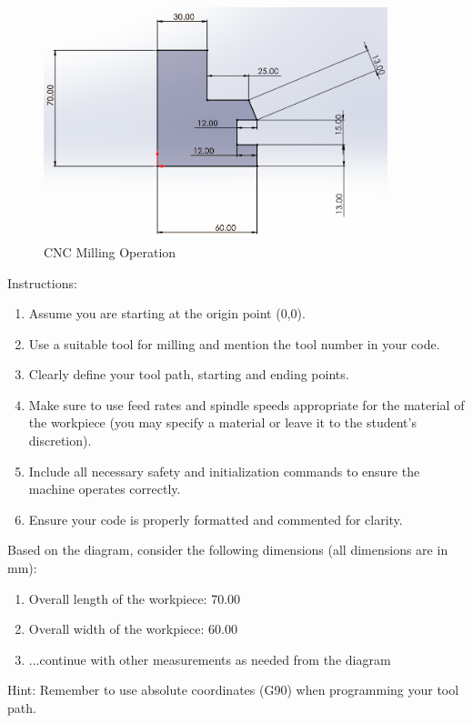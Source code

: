 \documentclass{article}
\begin{document}
\begin{figure}[h!]
\begin{center}
\includegraphics[width=10.0cm]{milling1}
\caption{CNC Milling Operation}
\label{fig1}
\end{center}
\end{figure}

Instructions:
\begin{enumerate}
	\item Assume you are starting at the origin point (0,0).
	\item Use a suitable tool for milling and mention the tool number in your code.
	\item Clearly define your tool path, starting and ending points.
	\item Make sure to use feed rates and spindle speeds appropriate for the material of the workpiece (you may specify a material or leave it to the student's discretion).
	\item Include all necessary safety and initialization commands to ensure the machine operates correctly.
	\item Ensure your code is properly formatted and commented for clarity.
\end{enumerate}

Based on the diagram, consider the following dimensions (all dimensions are in mm):
\begin{enumerate}
\item Overall length of the workpiece: 70.00
\item Overall width of the workpiece: 60.00
\item ...continue with other measurements as needed from the diagram
\end{enumerate}

Hint: Remember to use absolute coordinates (G90) when programming your tool path.
\end{document}
